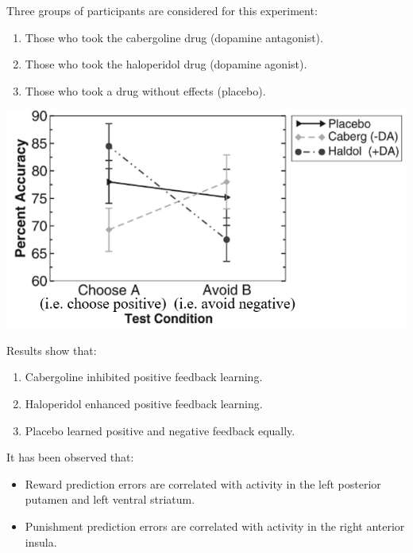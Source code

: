\begin{description}
\begin{@empty}
\begin{example}
                Three groups of participants are considered for this experiment:
                \begin{enumerate}
                    \item Those who took the cabergoline drug (dopamine antagonist).
                    \item Those who took the haloperidol drug (dopamine agonist).
                    \item Those who took a drug without effects (placebo).
                \end{enumerate}

                \begin{center}
                    \includegraphics[width=0.55\linewidth]{./img/instrumental_dopamine_selection2.png}
                \end{center}

                Results show that:
                \begin{enumerate}
                    \item Cabergoline inhibited positive feedback learning.
                    \item Haloperidol enhanced positive feedback learning.
                    \item Placebo learned positive and negative feedback equally.
                \end{enumerate}
            \end{example}
        \end{@empty}
        
        \begin{@empty}
            \small
            \begin{example}
                It has been observed that:
                \begin{itemize}
                    \item Reward prediction errors are correlated with activity in the left posterior putamen and left ventral striatum.
                    \item Punishment prediction errors are correlated with activity in the right anterior insula.
                \end{itemize}


\end{example}
\end{@empty}
\end{description}
